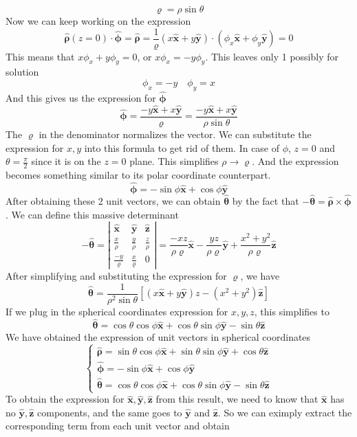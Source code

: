 \documentclass[12pt]{article}
\newcommand{\sqbkt}[1]{\left[ #1 \right]}
\newcommand{\paren}[1]{\left( #1 \right)}
\newcommand{\abso}[1]{\left|#1 \right|}
\newcommand{\unx}{\hat{\mathbf{x}}}
\newcommand{\uny}{\hat{\mathbf{y}}}
\newcommand{\unz}{\hat{\mathbf{z}}}
\newcommand{\untheta}{\hat{\boldsymbol\theta}}
\newcommand{\unphi}{\hat{\boldsymbol\phi}}
\newcommand{\unrho}{\hat{\boldsymbol\rho}}
\begin{document}
\begin{enumerate}
    \[
    \varrho = \rho\sin\theta
    \]
    Now we can keep working on the expression
    \[
    \unrho(z=0) \cdot \unphi = \unrho = \frac{1}{\varrho}\paren{x\unx + y\uny} \cdot \paren{\phi_x\unx + \phi_y\uny} = 0
    \]
    This means that $x\phi_x + y\phi_y = 0$, or $x\phi_x = -y\phi_y$. This leaves only 1 possibly for solution
    \[
    \phi_x = -y \quad \phi_y = x
    \]
    And this gives us the expression for $\unphi$
    \[
    \unphi = \frac{-y\unx + x\uny}{\varrho} = \frac{-y\unx + x\uny}{\rho\sin\theta} 
    \]
    The $\varrho$ in the denominator normalizes the vector. We can substitute the expression for $x,y$ into this formula to get rid of them. In case of $\phi$, $z=0$ and $\theta = \frac{\pi}{2}$ since it is on the $z=0$ plane. This simplifies $\rho \to \varrho$. And the expression becomes something similar to its polar coordinate counterpart. 
    \[
    \unphi = -\sin\phi\unx + \cos\phi \uny
    \]
    After obtaining these 2 unit vectors, we can obtain $\untheta$ by the fact that $-\untheta = \unrho \times \unphi$. We can define this massive determinant
    \[
    -\untheta = \abso{
    \begin{matrix}
        \unx & \uny & \unz \\
        \frac{x}{\rho}&\frac{y}{\rho}&\frac{z}{\rho}\\
        \frac{-y}{\varrho}&\frac{x}{\varrho}&0
    \end{matrix}
    } = \frac{-xz}{\rho\varrho}\unx - \frac{yz}{\rho\varrho}\uny + \frac{x^2+y^2}{\rho\varrho}\unz
    \]
    After simplifying and substituting the expression for $\varrho$, we have
    \[
    \untheta = \frac{1}{\rho^2\sin\theta}\sqbkt{\paren{x\unx + y\uny}z - \paren{x^2+y^2}\unz}
    \]
    If we plug in the spherical coordinates expression for $x,y,z$, this simplifies to
    \[
    \untheta = \cos\theta\cos\phi \unx + \cos\theta\sin\phi \uny - \sin\theta \unz
    \]
    We have obtained the expression of unit vectors in spherical coordinates
    \[
    \begin{cases}
        \unrho = \sin\theta\cos\phi \unx + \sin\theta\sin\phi\uny + \cos\theta \unz\\
        \unphi = -\sin\phi\unx + \cos\phi \uny\\
        \untheta = \cos\theta\cos\phi \unx + \cos\theta\sin\phi \uny - \sin\theta \unz
    \end{cases}
    \]
    To obtain the expression for $\unx, \uny, \unz$ from this result, we need to know that $\unx$ has no $\uny,\unz$ components, and the same goes to $\uny$ and $\unz$. So we can eximply extract the corresponding term from each unit vector and obtain

\end{enumerate}
\end{document}
